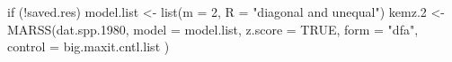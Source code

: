 \begin{Schunk}
\begin{Sinput}
 if (!saved.res) {
   model.list <- list(m = 2, R = "diagonal and unequal")
   kemz.2 <- MARSS(dat.spp.1980,
     model = model.list,
     z.score = TRUE, form = "dfa", control = big.maxit.cntl.list
   )
 }
\end{Sinput}
\end{Schunk}
